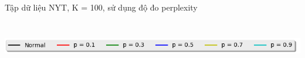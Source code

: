 \documentclass[pdf]{beamer}
\begin{document}
\begin{frame}{Tập dữ liệu NYT, K = 100, sử dụng độ đo perplexity }

\begin{columns}[T] %
	\begin{column}{.50\textwidth}
		\begin{figure}
		\end{figure}
	\end{column} %
	\hfill%
	\begin{column}{.50\textwidth}
		\begin{figure}
		\end{figure}				
	\end{column} %
\end{columns}
\begin{center}
	\includegraphics[width=1\textwidth]{menu.png}	
\end{center}
\end{frame}
\end{document}
